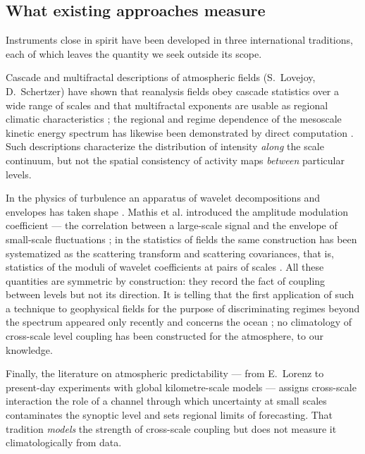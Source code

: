 \documentclass[11pt,a4paper]{article}
\begin{document}
\subsection{What existing approaches measure}

Instruments close in spirit have been developed in three international traditions, each of which leaves the quantity we seek outside its scope.

Cascade and multifractal descriptions of atmospheric fields (S.~Lovejoy, D.~Schertzer) have shown that reanalysis fields obey cascade statistics over a wide range of scales and that multifractal exponents are usable as regional climatic characteristics \cite{LovejoySchertzer2013,Lovejoy2011}; the regional and regime dependence of the mesoscale kinetic energy spectrum has likewise been demonstrated by direct computation \cite{Kouhen2024}. Such descriptions characterize the distribution of intensity \emph{along} the scale continuum, but not the spatial consistency of activity maps \emph{between} particular levels.

In the physics of turbulence an apparatus of wavelet decompositions and envelopes has taken shape \cite{Farge1992}. Mathis et al. introduced the amplitude modulation coefficient --- the correlation between a large-scale signal and the envelope of small-scale fluctuations \cite{Mathis2009}; in the statistics of fields the same construction has been systematized as the scattering transform and scattering covariances, that is, statistics of the moduli of wavelet coefficients at pairs of scales \cite{Mallat2012,BrunaMallat2013,Cheng2024}. All these quantities are symmetric by construction: they record the fact of coupling between levels but not its direction. It is telling that the first application of such a technique to geophysical fields for the purpose of discriminating regimes beyond the spectrum appeared only recently and concerns the ocean \cite{Skinner2025}; no climatology of cross-scale level coupling has been constructed for the atmosphere, to our knowledge.

Finally, the literature on atmospheric predictability --- from E.~Lorenz \cite{Lorenz1969} to present-day experiments with global kilometre-scale models \cite{Zhang2007,RotunnoSnyder2008,Judt2020,SelzCraig2023} --- assigns cross-scale interaction the role of a channel through which uncertainty at small scales contaminates the synoptic level and sets regional limits of forecasting. That tradition \emph{models} the strength of cross-scale coupling but does not measure it climatologically from data.
\end{document}
